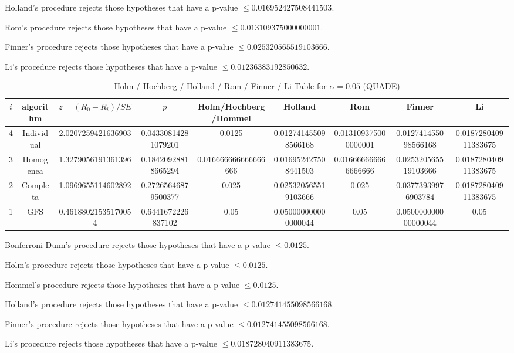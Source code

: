 \documentclass[a4paper,10pt]{article}
\begin{document}
\begin{landscape}
Holland's procedure rejects those hypotheses that have a p-value $\le0.016952427508441503$.


Rom's procedure rejects those hypotheses that have a p-value $\le0.013109375000000001$.


Finner's procedure rejects those hypotheses that have a p-value $\le0.025320565519103666$.


Li's procedure rejects those hypotheses that have a p-value $\le0.01236383192850632$.



\newpage

\begin{table}[!htp]
\centering\scriptsize
\caption{Holm / Hochberg / Holland / Rom / Finner / Li Table for $\alpha=0.05$ (QUADE)}
\begin{tabular}{ccccccccc}
$i$&algorithm&$z=(R_0 - R_i)/SE$&$p$&Holm/Hochberg/Hommel&Holland&Rom&Finner&Li\\
\hline
4&Individual&2.0207259421636903&0.04330814281079201&0.0125&0.012741455098566168&0.013109375000000001&0.012741455098566168&0.018728040911383675\\
3&Homogenea&1.3279056191361396&0.18420928818665294&0.016666666666666666&0.016952427508441503&0.016666666666666666&0.025320565519103666&0.018728040911383675\\
2&Completa&1.0969655114602892&0.27265646879500377&0.025&0.025320565519103666&0.025&0.03773939976903784&0.018728040911383675\\
1&GFS&0.46188021535170054&0.6441672226837102&0.05&0.050000000000000044&0.05&0.050000000000000044&0.05\\
\hline
\end{tabular}
\end{table}
Bonferroni-Dunn's procedure rejects those hypotheses that have a p-value $\le0.0125$.


Holm's procedure rejects those hypotheses that have a p-value $\le0.0125$.


Hommel's procedure rejects those hypotheses that have a p-value $\le0.0125$.


Holland's procedure rejects those hypotheses that have a p-value $\le0.012741455098566168$.


Finner's procedure rejects those hypotheses that have a p-value $\le0.012741455098566168$.


Li's procedure rejects those hypotheses that have a p-value $\le0.018728040911383675$.



\newpage


\end{landscape}
\end{document}
